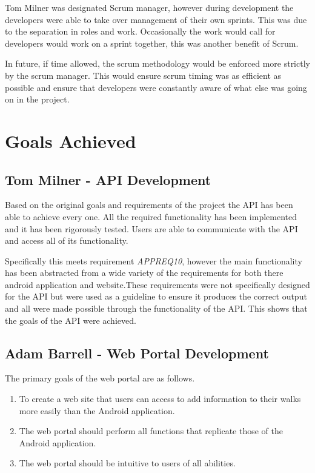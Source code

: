 \documentclass[11pt,a4paper]{report}
\begin{document}
Tom Milner was designated Scrum manager, however during development the developers were able to take over management of their own sprints. This was due to the separation in roles and work. Occasionally the work would call for developers would work on a sprint together, this was another benefit of Scrum. 

In future, if time allowed, the scrum methodology would be enforced more strictly by the scrum manager. This would ensure scrum timing was as efficient as possible and ensure that developers were constantly aware of what else was going on in the project. 

\section{Goals Achieved}
\label{sec:goals-achieved}

\subsection{Tom Milner - API Development}

Based on the original goals and requirements of the project the API has been able to achieve every one. All the required functionality has been implemented and it has been rigorously tested. Users are able to communicate with the API and access all of its functionality. 

Specifically this meets requirement  \emph{APPREQ10}, however the main functionality has been abstracted from a wide variety of the requirements  for both there android application and website.These requirements were not specifically designed for the API but were used as a guideline to ensure it produces the correct output and all were made possible through the functionality of the API. This shows that the goals of the API were achieved. 

\subsection{Adam Barrell - Web Portal Development}

The primary goals of the web portal are as follows.

\begin{enumerate}
\item To create a web site that users can access to add information to their walks more easily than the Android application.
\item The web portal should perform all functions that replicate those of the Android application.
\item The web portal should be intuitive to users of all abilities.
\end{enumerate}
\end{document}

